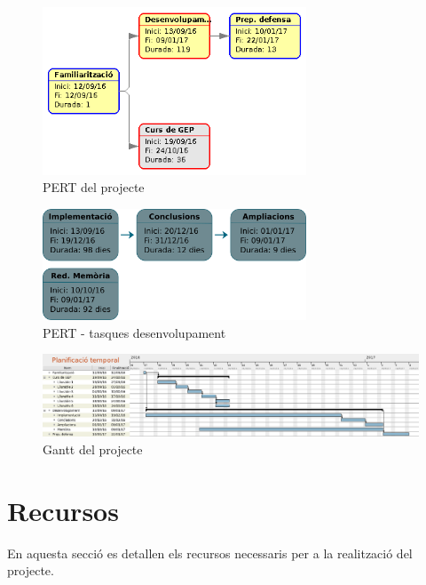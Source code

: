 		\begin{figure}[H]
			\centering
			\includegraphics[width=0.7\textwidth]{images/pert-global}
			\caption{PERT del projecte}
		\end{figure}
		\vspace{0.8cm}
		\begin{figure}[H]
			\centering
			\includegraphics[width=0.7\textwidth]{images/tasques}
			\caption{PERT - tasques desenvolupament}
		\end{figure}

		\restoregeometry
		\thispagestyle{empty}
		\begin{figure}
			\includegraphics[width=\textheight]{images/gantt}
			\caption{Gantt del projecte}
		\end{figure}
		\restoregeometry

\section{Recursos}
	En aquesta secció es detallen els recursos necessaris per a la realització del projecte. %
